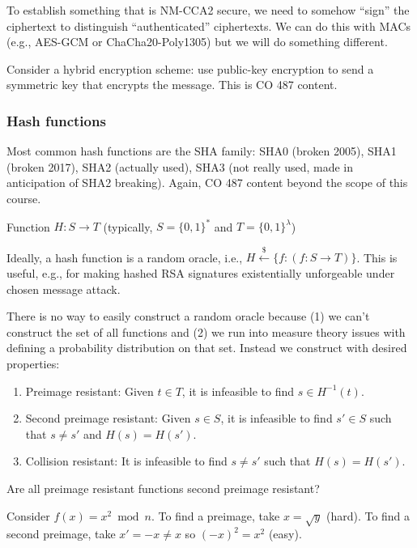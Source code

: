 \documentclass[notes]{agony}
\newcommand{\xgets}{\xleftarrow}
\begin{document}
To establish something that is NM-CCA2 secure, we need to somehow ``sign''
the ciphertext to distinguish ``authenticated'' ciphertexts.
We can do this with MACs (e.g., AES-GCM or ChaCha20-Poly1305)
but we will do something different.

Consider a hybrid encryption scheme:
use public-key encryption to send a symmetric key that encrypts the message.
This is CO 487 content.

\subsubsection*{Hash functions}

Most common hash functions are the SHA family:
SHA0 (broken 2005), SHA1 (broken 2017), SHA2 (actually used),
SHA3 (not really used, made in anticipation of SHA2 breaking).
Again, CO 487 content beyond the scope of this course.

\begin{defn}
  Function $H : S \to T$ (typically, $S = \{0,1\}^*$ and $T = \{0,1\}^\lambda$)
\end{defn}

Ideally, a hash function is a random oracle, i.e.,
$H \xgets{\$} \{ f : (f : S \to T) \}$.
This is useful, e.g., for making hashed RSA signatures
existentially unforgeable under chosen message attack.

There is no way to easily construct a random oracle
because (1) we can't construct the set of all functions and
(2) we run into measure theory issues with defining a probability distribution on that set.
Instead we construct with desired properties:
\begin{enumerate}[1.]
  \item Preimage resistant: Given $t \in T$, it is infeasible to find $s \in H^{-1}(t)$.
  \item Second preimage resistant: Given $s \in S$, it is infeasible to find
        $s' \in S$ such that $s \neq s'$ and $H(s) = H(s')$.
  \item Collision resistant: It is infeasible to find $s \neq s'$
        such that $H(s) = H(s')$.
\end{enumerate}

\begin{example}
  Are all preimage resistant functions second preimage resistant?
\end{example}
\begin{sol}
  Consider $f(x) = x^2 \bmod n$.
  To find a preimage, take $x = \sqrt{y}$ (hard).
  To find a second preimage, take $x' = -x \neq x$ so $(-x)^2 = x^2$ (easy).
\end{sol}
\end{document}
